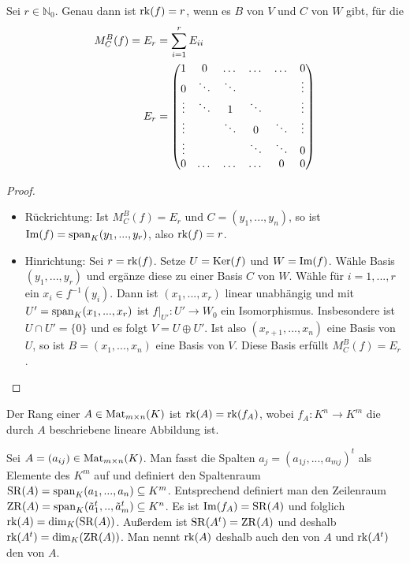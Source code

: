 \begin{proposition}
	Sei $r\in \mathbb N_0$. Genau dann ist $\operatorname{rk}(f)=r$, wenn es $B$ von $V$ und $C$ von $W$ gibt, für die 
	\begin{align}
		M_C^B(f)=E_r&=\sum_{i=1}^r E_{ii}\notag \\ 
		E_r&=\begin{pmatrix}
		1 & 0 & \dots & \dots & \dots & 0 \\
		0 & \ddots & \ddots & \; & \; & \vdots \\
		\vdots & \ddots & 1 & \ddots & \; & \vdots\\
		\vdots & \; & \ddots & 0 & \ddots & \vdots\\
		\vdots & \; & \; & \ddots & \ddots & 0\\
		0 & \dots & \dots & \dots & 0 & 0\\
		\end{pmatrix}\notag
	\end{align}
\end{proposition}
\begin{proof}
	\begin{itemize}
		\item Rückrichtung: Ist $M_C^B(f)=E_r$ und $C=(y_1,...,y_n)$, so ist $\operatorname{Im}(f)=\operatorname{span}_K(y_1,...,y_r)$, also $\operatorname{rk}(f)=r$.
		\item Hinrichtung: Sei $r=\operatorname{rk}(f)$. Setze $U=\operatorname{Ker}(f)$ und $W=\operatorname{Im}(f)$. Wähle Basis $(y_1,...,y_r)$ und ergänze diese zu einer Basis $C$ von 
		$W$. Wähle für $i=1,...,r$ ein $x_i\in f^{-1}(y_i)$. Dann ist $(x_1,...,x_r)$ linear unabhängig und mit $U'=\operatorname{span}_K(x_1,...,x_r)$ ist
		$f|_{U'}:U'\to W_0$ ein Isomorphismus. Insbesondere ist $U\cap U'=\{0\}$ und es folgt $V=U\oplus U'$. Ist also $(x_{r+1},...,x_n)$ 
		eine Basis von $U$, so ist $B=(x_1,...,x_n)$ eine Basis von $V$. Diese Basis erfüllt $M_C^B(f)=E_r$.
	\end{itemize}
\end{proof}

\begin{definition}
	Der Rang einer  $A\in \operatorname{Mat}_{m\times n}(K)$ ist $\operatorname{rk}(A)=\operatorname{rk}(f_A)$, wobei $f_A:K^n\to K^m$ 
	die durch $A$ beschriebene lineare Abbildung ist.
\end{definition}

\begin{remark}
	Sei $A=(a_{ij})\in \operatorname{Mat}_{m\times n}(K)$. Man fasst die Spalten $a_j=(a_{1j},...,a_{mj})^t$ als Elemente des $K^m$ auf 
	und definiert den Spaltenraum $\operatorname{SR}(A)=\operatorname{span}_K(a_1,...,a_n)\subseteq K^m$. Entsprechend definiert man den Zeilenraum $\operatorname{ZR}(A)=\operatorname{span}_K(
	\tilde a_1^t,..,\tilde a_m^t)\subseteq K^n$. Es ist $\operatorname{Im}(f_A)=\operatorname{SR}(A)$ und folglich $\operatorname{rk}(A)=\dim_K(\operatorname{SR}(A))$. Außerdem ist $\operatorname{SR}(A^t)=\operatorname{ZR}(A)$ 
	und deshalb $\operatorname{rk}(A^t)=\dim_K(\operatorname{ZR}(A))$. Man nennt $\operatorname{rk}(A)$ deshalb auch den  von $A$ und $\operatorname{rk}(A^t)$ den  von $A$.
\end{remark}

